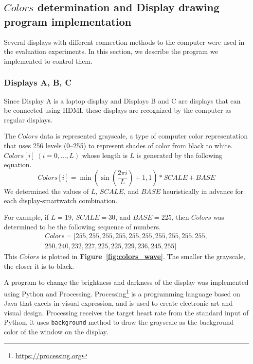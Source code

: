 \documentclass[sigchi,authordraft]{acmart}
\newcommand\figref[1]{\textbf{Figure~\ref{fig:#1}}}
\begin{document}
\subsection{$Colors$ determination and Display drawing program implementation}
\label{subsec:colors_and_program}
Several displays with different connection methods to the computer were used in the evaluation experiments. In this section, we describe the program we implemented to control them.

\subsubsection{Displays A, B, C}
Since Display A is a laptop display and Displays B and C are displays that can be connected using HDMI, these displays are recognized by the computer as regular displays.\par

The $Colors$ data is represented grayscale, a type of computer color representation that uses 256 levels (0--255) to represent shades of color from black to white. $Colors[i]~(i=0,\dots,L)$ whose length is $L$ is generated by the following equation.
\begin{equation}
  Colors[i]=\min\left(\sin\left(\frac{2\pi i}{L}\right)+1,1\right)*SCALE+BASE
\end{equation}
We determined the values of $L$, $SCALE$, and $BASE$ heuristically in advance for each display-smartwatch combination.\par

For example, if $L=19$, $SCALE=30$, and $BASE=225$, then $Colors$ was determined to be the following sequence of numbers.
\begin{equation*}
  \begin{split}
    Colors = [255, 255, 255, 255, 255, 255, 255, 255, 255, 255,\\250, 240, 232, 227, 225, 225, 229, 236, 245, 255]
  \end{split}
\end{equation*}
This $Colors$ is plotted in \figref{colors_wave}. The smaller the grayscale, the closer it is to black.\par

A program to change the brightness and darkness of the display was implemented using Python and Processing. Processing\footnote{\url{https://processing.org}} is a programming language based on Java that excels in visual expression, and is used to create electronic art and visual design. Processing receives the target heart rate from the standard input of Python, it uses \texttt{background} method to draw the grayscale as the background color of the window on the display.
\end{document}

